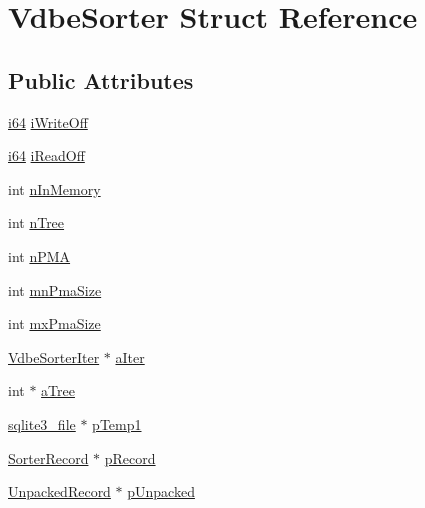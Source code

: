 \hypertarget{struct_vdbe_sorter}{\section{Vdbe\-Sorter Struct Reference}
\label{struct_vdbe_sorter}
}
\subsection*{Public Attributes}
\begin{DoxyCompactItemize}
\item 
\hyperlink{sqlite3_8c_a2a0f0f4ae7001eb54351f77ea1cdbcfd}{i64} \hyperlink{struct_vdbe_sorter_a5024b3ed80ebd013cad0bc694c81f488}{i\-Write\-Off}
\item 
\hyperlink{sqlite3_8c_a2a0f0f4ae7001eb54351f77ea1cdbcfd}{i64} \hyperlink{struct_vdbe_sorter_a5064ee91d2256d6176210b1556c13790}{i\-Read\-Off}
\item 
int \hyperlink{struct_vdbe_sorter_a4704f2debfdf60eeed3ea8cf95d142f9}{n\-In\-Memory}
\item 
int \hyperlink{struct_vdbe_sorter_a771cf7f8d421372bf58696cbec5d73dc}{n\-Tree}
\item 
int \hyperlink{struct_vdbe_sorter_a66e6ce431d22c97a6dc672fa94a16e3e}{n\-P\-M\-A}
\item 
int \hyperlink{struct_vdbe_sorter_a6d201d0f496260f7f2c7f450cae5898b}{mn\-Pma\-Size}
\item 
int \hyperlink{struct_vdbe_sorter_ab23b8039f7b58052b6c6dfc32aa895ed}{mx\-Pma\-Size}
\item 
\hyperlink{struct_vdbe_sorter_iter}{Vdbe\-Sorter\-Iter} $\ast$ \hyperlink{struct_vdbe_sorter_a7c4748645307e20a863cc50ddb75abef}{a\-Iter}
\item 
int $\ast$ \hyperlink{struct_vdbe_sorter_a77ff5480e8adac1521775d2e8a7be04f}{a\-Tree}
\item 
\hyperlink{structsqlite3__file}{sqlite3\-\_\-file} $\ast$ \hyperlink{struct_vdbe_sorter_a8c419244559c715dcff6415b61d0e3ce}{p\-Temp1}
\item 
\hyperlink{struct_sorter_record}{Sorter\-Record} $\ast$ \hyperlink{struct_vdbe_sorter_aedb82586e8b8710b2ef95a950d937893}{p\-Record}
\item 
\hyperlink{struct_unpacked_record}{Unpacked\-Record} $\ast$ \hyperlink{struct_vdbe_sorter_a0d85cdf1cf25c75cf90394d1bcfd27b9}{p\-Unpacked}
\end{DoxyCompactItemize}



